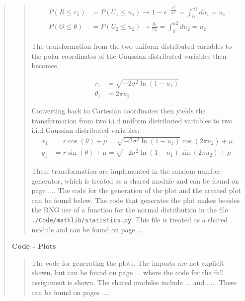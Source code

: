 \begin{quote}
\begin{quote}
\begin{align}
P(R \leq r_1) &= P(U_1 \leq u_1) \rightarrow  1 - e^{- \frac{r_1^2}{2\sigma^2}}  = \int_{0}^{u1} du_1 = u_1 \\
P(\Theta \leq \theta) &= P(U_2 \leq u_2) \rightarrow   \frac{\theta_1}{2\pi} = \int_{0}^{u2} du_2 = u_2 
\end{align}

The transformation from the two uniform distributed variables to the polar coordinates of the Gaussian distributed variables then becomes,

\begin{align}
r_1 &=  \sqrt{-2\sigma^2 \ln(1 - u_1)} \\
\theta_1 &= 2 \pi u_2
\end{align}

Converting back to Cartesian coordinates then yields the transformation from two i.i.d uniform distributed variables to two i.i.d Gaussian distributed variables;
\begin{align*}
x_1 &= r\cos(\theta) + \mu = \sqrt{-2\sigma^2 \ln(1 - u_1)} \cos( 2 \pi u_2 ) + \mu \\
y_1 &= r\sin(\theta) + \mu = \sqrt{-2\sigma^2 \ln(1 - u_1)} \sin( 2 \pi u_2 ) + \mu
\end{align*}

These transformation are implemented in  the random number generator, which is treated as a shared module and can be found on page .... The code for the generation of the plot and the created plot can be found below. The code that generates the plot makes besides the RNG use of a function for the normal distribution in the file \texttt{./Code/mathlib/statistics.py}. This file is treated as a shared module and can be found on page ...


\end{quote}

\textbf{Code - Plots}

\begin{quote}
The code for generating the plots. The imports are not explicit shown, but can be found on page ... where the code for the full assignment is shown. The shared modules include ... and .... .These can be found on pages .... 



\end{quote}



\end{quote}
